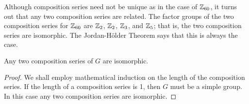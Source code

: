  
 
Although composition series need not be unique as in the case of
${\Bbb Z}_{60}$, it turns out that any two composition series are
related. The factor groups of the two composition series for ${\Bbb 
Z}_{60}$ are ${\Bbb Z}_2$,  ${\Bbb Z}_2$,  ${\Bbb Z}_3$, and  ${\Bbb
Z}_5$; that is,  the two composition series are isomorphic. The
Jordan-H\"{o}lder Theorem says that this is always the case.
 
 
\begin{theorem}
Any two composition series of $G$ are isomorphic.
\end{theorem}
 
 
\begin{proof}
We shall employ mathematical induction on the length of the
composition series.  If the length of a composition series is 1, 
then $G$ must be a simple group.  In this case any two composition
series are isomorphic.
 

\end{proof}
